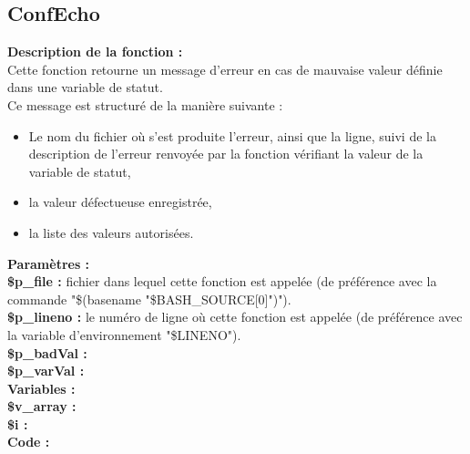 \documentclass[a4paper,10pt]{article}
\begin{document}
\subsection{ConfEcho}\color{white}
\begin{flushleft}
	\textbf{Description de la fonction :}\\
   	Cette fonction retourne un message d'erreur en cas de mauvaise valeur définie dans une variable de statut.\\[1\baselineskip]
   	Ce message est structuré de la manière suivante :\\
   	\begin{itemize}
   		\item Le nom du fichier où s'est produite l'erreur, ainsi que la ligne, suivi de la description de l'erreur renvoyée par la fonction vérifiant la valeur de la variable de statut,
   		\item la valeur défectueuse enregistrée,
   		\item la liste des valeurs autorisées.\\[1\baselineskip]
   	\end{itemize}

   	\textbf{Paramètres :}\\
   	\color{orange}\textbf{\$p\_file\color{white} :} \color{white} fichier dans lequel cette fonction est appelée (de préférence avec la commande "\$(\color{gray}basename \color{white}"\color{orange}\$BASH\_SOURCE[0]\color{white}")").\\
   	\color{orange}\textbf{\$p\_lineno\color{white} :} \color{white} le numéro de ligne où cette fonction est appelée (de préférence avec la variable d'environnement "\color{orange}\$LINENO\color{white}").\\
   	\color{orange}\textbf{\$p\_badVal\color{white} :} \color{white}\\
   	\color{orange}\textbf{\$p\_varVal\color{white} :} \color{white}\\[1\baselineskip]
    
   	\textbf{Variables :}\\
   	\color{orange}\textbf{\$v\_array\color{white} :} \color{white} \\
   	\color{orange}\textbf{\$i\color{white} :} \color{white}\\[1\baselineskip]

    \textbf{Code :}\\
\end{flushleft}
\end{document}
